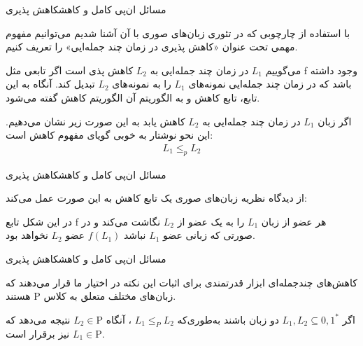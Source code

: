 \begin{itemframe-s}{مسائل ان‌پی کامل و کاهش}{کاهش پذیری}
\item[-]
با استفاده از چارچوبی که در تئوری زبان‌های صوری با آن آشنا شدیم می‌توانیم مفهوم مهمی تحت عنوان «کاهش پذیری در زمان چند جمله‌ایی»
را تعریف کنیم.
\item[-]
می‌گوییم $ L_1 $ در زمان چند جمله‌ایی به $ L_2 $  کاهش پذی است  اگر تابعی مثل f وجود داشته باشد که در زمان چند جمله‌ایی نمونه‌های $ L_1 $ را به نمونه‌های $ L_2 $ تبدیل کند. آنگاه به این تابع، تابع کاهش
و به الگوریتم آن الگوریتم کاهش
گفته می‌شود.
\item[-]
اگر زبان $ L_1 $ در زمان چند جمله‌ایی به $ L_2 $ کاهش یابد به این صورت زیر نشان می‌دهیم. این نحو نوشتار به خوبی گویای مفهوم کاهش است:
\begin{align*}
L_1 \leq_p L_2
\end{align*}
\end{itemframe-s}


\begin{itemframe-s}{مسائل ان‌پی کامل و کاهش}{کاهش پذیری}
\item[-]
از دیدگاه نظریه زبان‌های صوری یک تابع کاهش به این صورت عمل می‌کند:
 \item[-]
در این شکل تابع f هر عضو از زبان  $ L_1 $ را به یک عضو از $ L_2 $ نگاشت می‌کند و در صورتی که زبانی عضو  $ L_1 $  نباشد $ f(L_1)$ عضو $ L_2 $ نخواهد بود.

\end{itemframe-s}


\begin{itemframe-s}{مسائل ان‌پی کامل و کاهش}{کاهش پذیری}
\item[-]
کاهش‌های چندجمله‌ای ابزار قدرتمندی برای اثبات این نکته در اختیار ما قرار می‌دهند که زبان‌های مختلف متعلق به کلاس
 $\mathrm{P}$
هستند.
\item[-]
اگر
$L_1, L_2 \subseteq {0,1}^*$
دو زبان باشند به‌طوری‌که
$L_1 \leq_P L_2$
، آنگاه
$L_2 \in \mathrm{P}$
 نتیجه می‌دهد که
$L_1 \in \mathrm{P}$
نیز برقرار است.

\end{itemframe-s}


